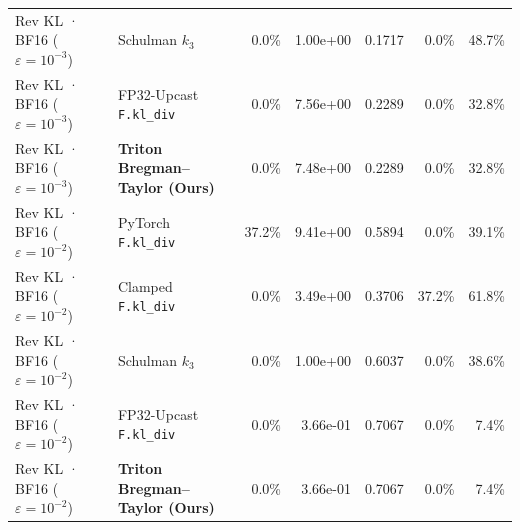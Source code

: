 \documentclass[10pt]{article}
\begin{document}
\begin{table}[t]
{\begin{tabular}{llrrrrr}
    Rev KL · BF16 ($\varepsilon=10^{-3}$) & Schulman $k_3$ & 0.0\% & 1.00e+00 & 0.1717 & 0.0\% & 48.7\% \\
    Rev KL · BF16 ($\varepsilon=10^{-3}$) & FP32-Upcast \texttt{F.kl\_div} & 0.0\% & 7.56e+00 & 0.2289 & 0.0\% & 32.8\% \\
    Rev KL · BF16 ($\varepsilon=10^{-3}$) & \textbf{Triton Bregman--Taylor (Ours)} & 0.0\% & 7.48e+00 & 0.2289 & 0.0\% & 32.8\% \\
    \midrule
    Rev KL · BF16 ($\varepsilon=10^{-2}$) & PyTorch \texttt{F.kl\_div} & 37.2\% & 9.41e+00 & 0.5894 & 0.0\% & 39.1\% \\
    Rev KL · BF16 ($\varepsilon=10^{-2}$) & Clamped \texttt{F.kl\_div} & 0.0\% & 3.49e+00 & 0.3706 & 37.2\% & 61.8\% \\
    Rev KL · BF16 ($\varepsilon=10^{-2}$) & Schulman $k_3$ & 0.0\% & 1.00e+00 & 0.6037 & 0.0\% & 38.6\% \\
    Rev KL · BF16 ($\varepsilon=10^{-2}$) & FP32-Upcast \texttt{F.kl\_div} & 0.0\% & 3.66e-01 & 0.7067 & 0.0\% & 7.4\% \\
    Rev KL · BF16 ($\varepsilon=10^{-2}$) & \textbf{Triton Bregman--Taylor (Ours)} & 0.0\% & 3.66e-01 & 0.7067 & 0.0\% & 7.4\% \\
    \bottomrule
  \end{tabular}}
\end{table}

\begin{table}[t]
  \centering
  \caption{RTX~5090 BF16 forward+backward latency (CUDA events, 20 runs) and peak extra VRAM vs.\ FP32-upcast, PyTorch~2.11 \texttt{torch.compile} (TorchInductor), and row-chunked FP32 (chunk=64).}
  \label{tab:kl_scaling}
  \scriptsize
\end{table}
\end{document}
